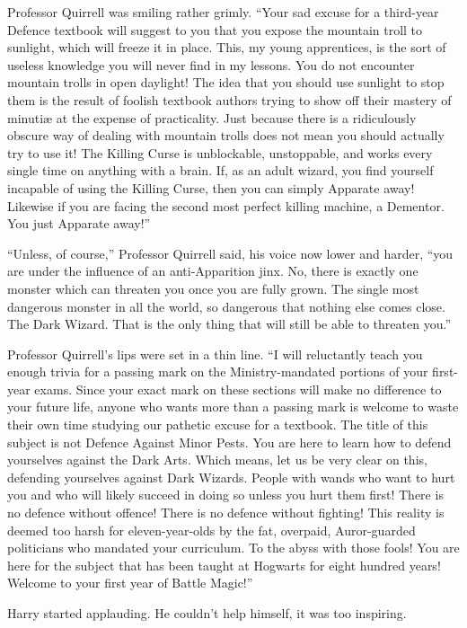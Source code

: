 Professor Quirrell was smiling rather grimly. “Your sad excuse for a third-year Defence textbook will suggest to you that you expose the mountain troll to sunlight, which will freeze it in place. This, my young apprentices, is the sort of useless knowledge you will never find in my lessons. You do not encounter mountain trolls in open daylight! The idea that you should use sunlight to stop them is the result of foolish textbook authors trying to show off their mastery of minutiæ at the expense of practicality. Just because there is a ridiculously obscure way of dealing with mountain trolls does not mean you should actually try to use it! The Killing Curse is unblockable, unstoppable, and works every single time on anything with a brain. If, as an adult wizard, you find yourself incapable of using the Killing Curse, then you can simply Apparate away! Likewise if you are facing the second most perfect killing machine, a Dementor. You just Apparate away!”

“Unless, of course,” Professor Quirrell said, his voice now lower and harder, “you are under the influence of an anti-Apparition jinx. No, there is exactly one monster which can threaten you once you are fully grown. The single most dangerous monster in all the world, so dangerous that nothing else comes close. The Dark Wizard. That is the only thing that will still be able to threaten you.”

Professor Quirrell’s lips were set in a thin line. “I will reluctantly teach you enough trivia for a passing mark on the Ministry-mandated portions of your first-year exams. Since your exact mark on these sections will make no difference to your future life, anyone who wants more than a passing mark is welcome to waste their own time studying our pathetic excuse for a textbook. The title of this subject is not Defence Against Minor Pests. You are here to learn how to defend yourselves against the Dark Arts. Which means, let us be very clear on this, defending yourselves against Dark Wizards. People with wands who want to hurt you and who will likely succeed in doing so unless you hurt them first! There is no defence without offence! There is no defence without fighting! This reality is deemed too harsh for eleven-year-olds by the fat, overpaid, Auror-guarded politicians who mandated your curriculum. To the abyss with those fools! You are here for the subject that has been taught at Hogwarts for eight hundred years! Welcome to your first year of Battle Magic!”

Harry started applauding. He couldn’t help himself, it was too inspiring.

